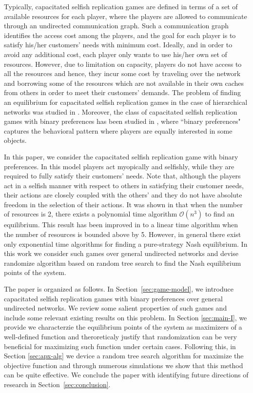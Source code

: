 Typically, capacitated selfish replication games are defined in terms of a set of available resources for each player, where the players are allowed to communicate through an undirected communication graph. Such a communication graph identifies the access cost among the players, and the goal for each player is to satisfy his/her customers' needs with minimum cost. Ideally, and in order to avoid any additional cost, each player only wants to use his/her own set of resources. However, due to limitation on capacity, players do not have access to all the resources and hence, they incur some cost by traveling over the network and borrowing some of the resources which are not available in their own caches from others in order to meet their customers' demands. The problem of finding an equilibrium for capacitated selfish replication games in the case of hierarchical networks was studied in \cite{gopalakrishnan2012cache}. Moreover, the class of capacitated selfish replication games with binary preferences has been studied in \cite{gopalakrishnan2012cache,etesami2014pure}, where ``binary preferences" captures the behavioral pattern where players are
equally interested in some objects.

In this paper, we consider the capacitated selfish replication game with binary preferences. In this model players act myopically and selfishly, while they are required to fully satisfy their customers' needs. Note that, although the players act in a selfish manner with respect to others in satisfying their customer needs, their actions are closely coupled with the others' and they do not have absolute freedom in the selection of their actions. It was shown in \cite{gopalakrishnan2012cache} that when the number of resources is 2, there exists a polynomial time algorithm $\mathcal{O}(n^3)$ to find an equilibrium. This result has been improved in \cite{etesami2014pure} to a linear time algorithm when the number of resources is bounded above by 5. However, in general there exist only exponential time algorithms for finding a pure-strategy Nash equilibrium. In this work we consider such games over general undirected networks and devise randomize algorithm based on random tree search to find the Nash equilibrium points of the system.

The paper is organized as follows. In Section~\ref{sec:game-model}, we introduce capacitated selfish replication games with binary preferences over general undirected networks. We review some salient properties of such games and include some relevant existing results on this problem. In Section \ref{sec:main-I}, we provide we characterzie the equilibrium points of the system as maximizers of a well-defined function and theroreticaly justify that randomization can be very beneficial for maximizing such function under certain cases. Following this, in Section \ref{sec:apx-alg} we device a random tree search algorithm for maximize the objective function and through numerous simulations we show that this method can be quite effective. We conclude the paper with identifying future directions of research in Section~\ref{sec:conclusion}.

